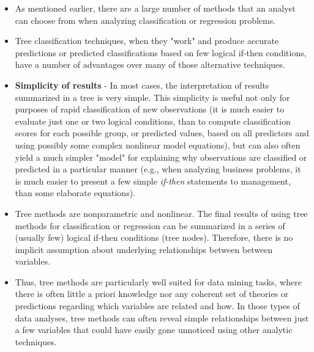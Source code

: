 \documentclass[caret-main.tex]{subfiles}
\begin{document}
\begin{itemize}
\item As mentioned earlier, there are a large number of methods that an analyst can choose from when analyzing classification or regression problems. 
\item Tree classification techniques, when they "work" and produce accurate predictions or predicted classifications based on few logical if-then conditions, have a number of advantages over many of those alternative techniques.

\item \textbf{Simplicity of results} - In most cases, the interpretation of results summarized in a tree is very simple. This simplicity is useful not only for purposes of rapid classification of new observations (it is much easier to evaluate just one or two logical conditions, than to compute classification scores for each possible group, or predicted values, based on all predictors and using possibly some complex nonlinear model equations), but can also often yield a much simpler "model" for explaining why observations are classified or predicted in a particular manner (e.g., when analyzing business problems, it is much easier to present a few simple \textit{if-then} statements to management, than some elaborate equations).

\item Tree methods are nonparametric and nonlinear. The final results of using tree methods for classification or regression can be summarized in a series of (usually few) logical if-then conditions (tree nodes). Therefore, there is no implicit assumption about underlying relationships between between variables.
 
\item Thus, tree methods are particularly well suited for data mining tasks, where there is often little a priori knowledge nor any coherent set of theories or predictions regarding which variables are related and how. In those types of data analyses, tree methods can often reveal simple relationships between just a few variables that could have easily gone unnoticed using other analytic techniques.
\end{itemize}
\newpage

\end{document}
